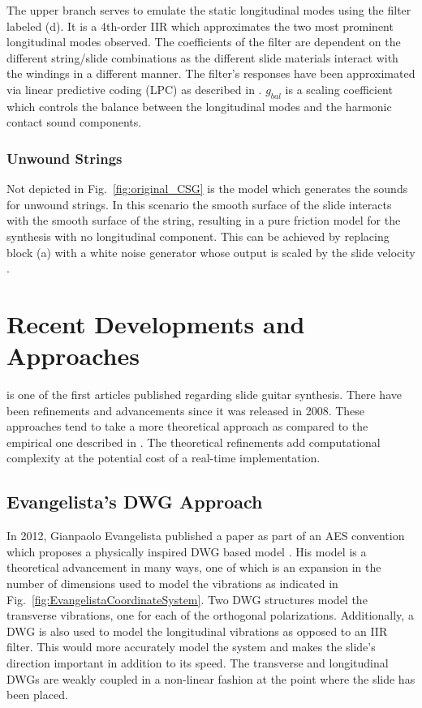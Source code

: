 \documentclass[main.tex]{subfiles}
\begin{document}
The upper branch serves to emulate the static longitudinal modes using the filter labeled (d). It is a 4th-order IIR which approximates the two most prominent longitudinal modes observed. The coefficients of the filter are dependent on the different string/slide combinations as the different slide materials interact with the windings in a different manner. The filter's responses have been approximated via linear predictive coding (LPC) as described in . $g_{bal}$ is a scaling coefficient which controls the balance between the longitudinal modes and the harmonic contact sound components.

\subsubsection{Unwound Strings}
Not depicted in Fig.~\ref{fig:original_CSG} is the model which generates the sounds for unwound strings. In this scenario the smooth surface of the slide interacts with the smooth surface of the string, resulting in a pure friction model for the synthesis with no longitudinal component. This can be achieved by replacing block (a) with a white noise generator whose output is scaled by the slide velocity .

\section{Recent Developments and Approaches}
 is one of the first articles published regarding slide guitar synthesis. There have been refinements and advancements since it was released in 2008. These approaches tend to take a more theoretical approach as compared to the empirical one described in . The theoretical refinements add computational complexity at the potential cost of a real-time implementation.

\subsection{Evangelista's DWG Approach}
In 2012, Gianpaolo Evangelista published a paper as part of an AES convention which proposes a physically inspired DWG based model . His model is a theoretical advancement in many ways, one of which is an expansion in the number of dimensions used to model the vibrations as indicated in Fig.~\ref{fig:EvangelistaCoordinateSystem}. Two DWG structures model the transverse vibrations, one for each of the orthogonal polarizations. Additionally, a DWG is also used to model the longitudinal vibrations as opposed to an IIR filter. This would more accurately model the system and makes the slide's direction important in addition to its speed. The transverse and longitudinal DWGs are weakly coupled in a non-linear fashion at the point where the slide has been placed.
\end{document}
